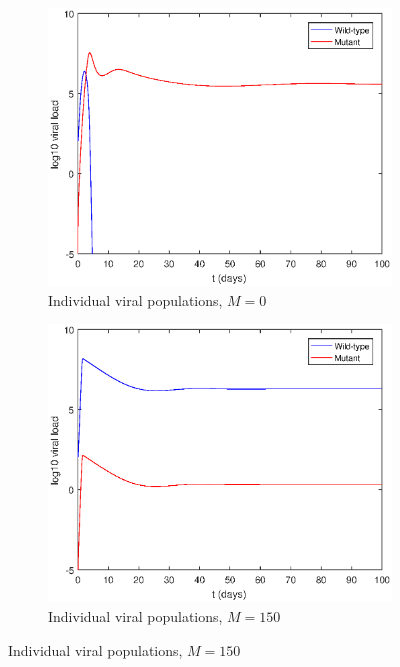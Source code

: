 \documentclass[11pt, oneside]{article}    %
\begin{document}
\begin{figure}[H]
\centering
\begin{subfigure}{.5\textwidth}
  \centering
  \includegraphics[scale = 0.5]{control_dynamics.eps}
  \caption{Individual viral populations, $M=0$}
\end{subfigure}%
\begin{subfigure}{.5\textwidth}
  \centering
  \includegraphics[scale = 0.5]{morphine_dynamics.eps}
  \caption{Individual viral populations, $M=150$}
\end{subfigure}
\label{fig:test}
\end{figure}
\end{document}
